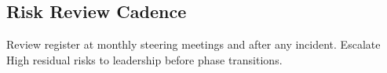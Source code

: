\subsection{Risk Review Cadence}

Review register at monthly steering meetings and after any incident.
Escalate High residual risks to leadership before phase transitions.
